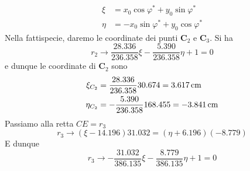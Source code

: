 \begin{align*}
\xi &= x_{0}\cos\varphi^{*}+y_{0}\sin\varphi^{*} \\ 
\eta &= -x_{0}\sin\varphi^{*}+y_{0}\cos\varphi^{*}
\end{align*}
Nella fattispecie, daremo le coordinate dei punti $\mathbf{C}_2$ e $\mathbf{C}_3$. Si ha
\begin{equation*}
r_2 \longrightarrow \frac{28.336}{236.358}\xi - \frac{5.390}{236.358}\eta + 1 = 0
\end{equation*}
e dunque le coordinate di $\mathbf{C}_2$ sono 
\begin{align*}
\xi_{C_{2}} &= \frac{28.336}{236.358}30.674 = 3.617\,\textup{cm} \\ 
\eta_{C_{2}} &= -\frac{5.390}{236.358}168.455 = -3.841\,\textup{cm}
\end{align*}
Passiamo alla retta $CE = r_3$ 
\begin{equation*}
r_3 \longrightarrow (\xi - 14.196)31.032 = (\eta+6.196)(-8.779)
\end{equation*}
E dunque 
\begin{equation*}
r_3 \longrightarrow -\frac{31.032}{386.135}\xi - \frac{8.779}{386.135}\eta + 1 = 0
\end{equation*}
